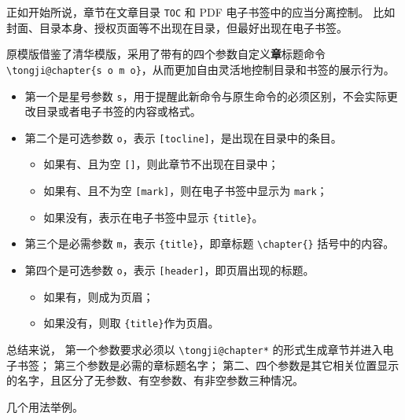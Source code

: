 \documentclass[../Main/thesis.tex]{subfiles}
\begin{document}
正如开始所说，章节在文章目录 \texttt{TOC} 和 PDF
电子书签中的应当分离控制。
比如封面、目录本身、授权页面等不出现在目录，但最好出现在电子书签。

原模版借鉴了清华模版，采用了带有的四个参数自定义\textbf{章}标题命令
\texttt{\textbackslash{}tongji@chapter\{s\ o\ m\ o\}}，从而更加自由灵活地控制目录和书签的展示行为。

\begin{itemize}
\item
  第一个是星号参数
  \texttt{s}，用于提醒此新命令与原生命令的必须区别，不会实际更改目录或者电子书签的内容或格式。
\item
  第二个是可选参数 \texttt{o}，表示
  \texttt{{[}tocline{]}}，是出现在目录中的条目。

  \begin{itemize}
  \item
    如果有、且为空 \texttt{{[}{]}}，则此章节不出现在目录中；
  \item
    如果有、且不为空 \texttt{{[}mark{]}}，则在电子书签中显示为
    \texttt{mark}；
  \item
    如果没有，表示在电子书签中显示 \texttt{\{title\}}。
  \end{itemize}
\item
  第三个是必需参数 \texttt{m}，表示 \texttt{\{title\}}，即章标题
  \texttt{\textbackslash{}chapter\{\}} 括号中的内容。
\item
  第四个是可选参数 \texttt{o}，表示
  \texttt{{[}header{]}}，即页眉出现的标题。

  \begin{itemize}
  \item
    如果有，则成为页眉；
  \item
    如果没有，则取 \texttt{\{title\}}作为页眉。
  \end{itemize}
\end{itemize}

总结来说， 第一个参数要求必须以 \texttt{\textbackslash{}tongji@chapter*}
的形式生成章节并进入电子书签； 第三个参数是必需的章标题名字；
第二、四个参数是其它相关位置显示的名字，且区分了无参数、有空参数、有非空参数三种情况。

几个用法举例。
\end{document}
